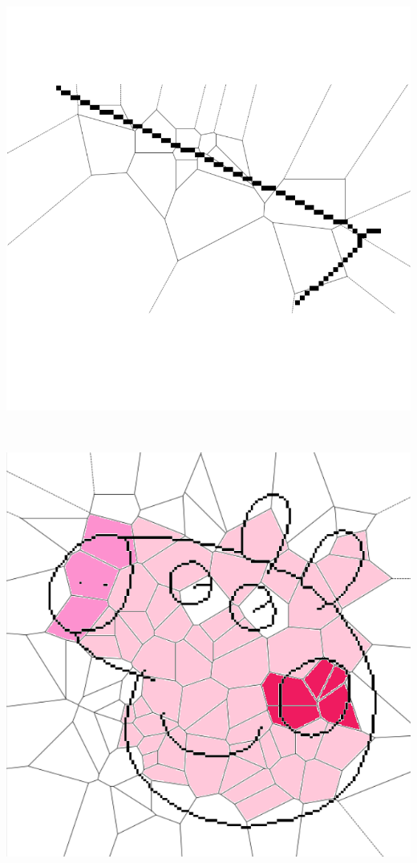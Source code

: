 \documentclass[a1,portrait]{a0poster}
\begin{document}
\begin{multicols}{2}
\begin{center}
	\begin{minipage}{.5\linewidth}
		\centering
		\includegraphics[width=.95\linewidth]{proc/check.png}
		\label{fig:skeleton1}
	\end{minipage}%
~
	\begin{minipage}{.5\linewidth}
		\centering
		\includegraphics[width=.95\linewidth]{proc/randompeppa.png}
	\end{minipage}
\end{center}





\end{multicols}
\end{document}
